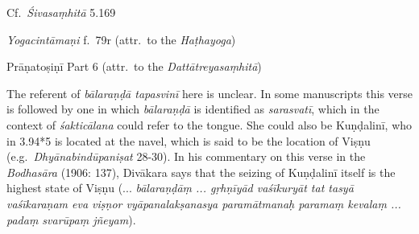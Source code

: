 \begin{ekdosis}
\begin{sources}[hp03_095]
Cf.~\emph{Śivasaṃhitā} 5.169
\begin{versinnote}
\end{versinnote}
\end{sources}

\begin{testimonia}[hp03_095]
\emph{Yogacintāmaṇi} f.~79r (attr.~to the \emph{Haṭhayoga})
\begin{versinnote}
\end{versinnote}


Prāṇatoṣiṇī Part 6 (attr.~to the \emph{Dattātreyasaṃhitā})
\begin{versinnote}
\end{versinnote}


\end{testimonia}

\begin{philcomm}[hp03_095]
The referent of \emph{bālaraṇḍā tapasvinī} here is unclear. In some manuscripts this verse is followed by one in which \emph{bālaraṇḍā} is identified as \emph{sarasvatī}, which in the context of \emph{śakticālana} could refer to the tongue. She could also be Kuṇḍalinī, who in 3.94*5 is located at the navel, which is said to be the location of Viṣṇu (e.g.~\emph{Dhyāna\-bindū\-paniṣat} 28-30). In his commentary on this verse in the \emph{Bodhasāra} (1906: 137), Divākara says that the seizing of Kuṇḍalinī itself is the highest state of Viṣṇu (... \emph{bālaraṇḍāṃ ... gṛhṇīyād vaśīkuryāt tat tasyā vaśīkaraṇam eva viṣṇor vyāpana\-lakṣa\-nasya paramā\-tmanaḥ paramaṃ kevalaṃ ... padaṃ svarūpaṃ jñeyam}).


\end{philcomm}
\end{ekdosis}
